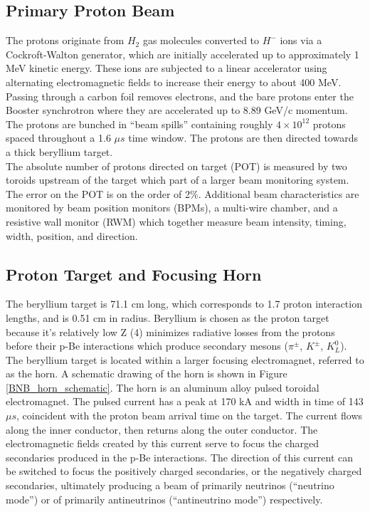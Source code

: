 \subsection{Primary Proton Beam}
The protons originate from $H_2$ gas molecules converted to $H^-$ ions via a Cockroft-Walton generator, which are initially accelerated up to approximately 1 MeV kinetic energy. These ions are subjected to a linear accelerator using alternating electromagnetic fields to increase their energy to about 400 MeV. Passing through a carbon foil removes electrons, and the bare protons enter the Booster synchrotron where they are accelerated up to 8.89 GeV/c momentum. The protons are bunched in ``beam spills'' containing roughly $4\times10^{12}$ protons spaced throughout a 1.6 $\mu s$ time window. The protons are then directed towards a thick beryllium target.\\

The absolute number of protons directed on target (POT) is measured by two toroids upstream of the target which part of a larger beam monitoring system. The error on the POT is on the order of 2\%. Additional beam characteristics are monitored by beam position monitors (BPMs), a multi-wire chamber, and a resistive wall monitor (RWM) which together measure beam intensity, timing, width, position, and direction.

\subsection{Proton Target and Focusing Horn}
The beryllium target is 71.1 cm long, which corresponds to 1.7 proton interaction lengths, and is 0.51 cm in radius. Beryllium is chosen as the proton target because it's relatively low Z (4) minimizes radiative losses from the protons before their p-Be interactions which produce secondary mesons ($\pi^\pm$, $K^\pm$, $K^0_L$).\\

The beryllium target is located within a larger focusing electromagnet, referred to as the horn. A schematic drawing of the horn is shown in Figure \ref{BNB_horn_schematic}. The horn is an aluminum alloy pulsed toroidal electromagnet. The pulsed current has a peak at 170 kA and width in time of 143 $\mu s$, coincident with the proton beam arrival time on the target. The current flows along the inner conductor, then returns along the outer conductor. The electromagnetic fields created by this current serve to focus the charged secondaries produced in the p-Be interactions. The direction of this current can be switched to focus the positively charged secondaries, or the negatively charged secondaries, ultimately producing a beam of primarily neutrinos (``neutrino mode'') or of primarily antineutrinos (``antineutrino mode'') respectively.

